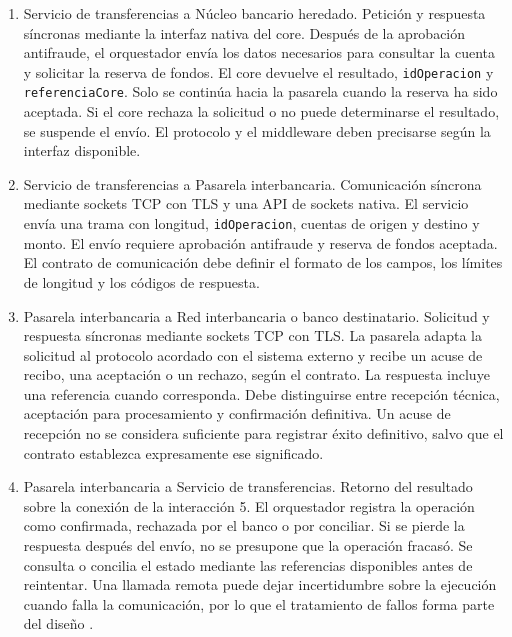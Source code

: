 \documentclass[12pt,a4paper]{article}
\begin{document}
\begin{enumerate}
    \item Servicio de transferencias a Núcleo bancario
    heredado.
    Petición y respuesta síncronas mediante la interfaz nativa
    del core. Después de la aprobación antifraude, el
    orquestador envía los datos necesarios para consultar
    la cuenta y solicitar la reserva de fondos. El core
    devuelve el resultado, \texttt{idOperacion} y
    \texttt{referenciaCore}. Solo se continúa hacia la
    pasarela cuando la reserva ha sido aceptada. Si el core
    rechaza la solicitud o no puede determinarse el resultado,
    se suspende el envío. El protocolo y el middleware deben
    precisarse según la interfaz disponible.

    \item Servicio de transferencias a Pasarela interbancaria.
    Comunicación síncrona mediante sockets TCP con TLS y
    una API de sockets nativa. El servicio envía una trama
    con longitud, \texttt{idOperacion}, cuentas de origen y
    destino y monto. El envío requiere aprobación antifraude
    y reserva de fondos aceptada. El contrato de comunicación
    debe definir el formato de los campos, los límites de
    longitud y los códigos de respuesta.

    \item Pasarela interbancaria a Red interbancaria o banco
    destinatario.
    Solicitud y respuesta síncronas mediante sockets TCP
    con TLS. La pasarela adapta la solicitud al protocolo
    acordado con el sistema externo y recibe un acuse de
    recibo, una aceptación o un rechazo, según el contrato.
    La respuesta incluye una referencia cuando corresponda.
    Debe distinguirse entre recepción técnica, aceptación
    para procesamiento y confirmación definitiva. Un acuse
    de recepción no se considera suficiente para registrar
    éxito definitivo, salvo que el contrato establezca
    expresamente ese significado.

    \item Pasarela interbancaria a Servicio de transferencias.
    Retorno del resultado sobre la conexión de la
    interacción 5. El orquestador registra la operación
    como confirmada, rechazada por el banco o por conciliar.
    Si se pierde la respuesta después del envío, no se
    presupone que la operación fracasó. Se consulta o
    concilia el estado mediante las referencias disponibles
    antes de reintentar. Una llamada remota puede dejar
    incertidumbre sobre la ejecución cuando falla la
    comunicación, por lo que el tratamiento de fallos
    forma parte del diseño \cite{birrell1984}.


\end{enumerate}
\end{document}
